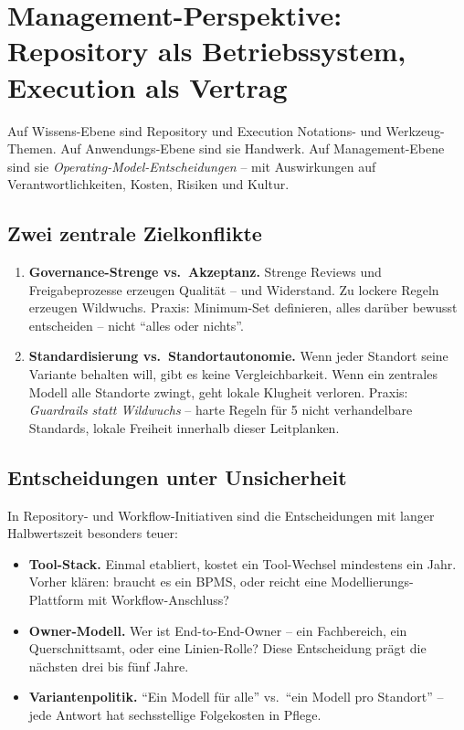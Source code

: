 \documentclass[11pt,a4paper,oneside]{article}
\newcommand{\fachbegriff}[1]{\textbf{#1}}
\begin{document}
\section{Management-Perspektive: Repository als Betriebssystem, Execution als Vertrag}

Auf Wissens-Ebene sind Repository und Execution Notations- und Werkzeug-Themen. Auf Anwendungs-Ebene sind sie Handwerk. Auf Management-Ebene sind sie \emph{Operating-Model-Entscheidungen} -- mit Auswirkungen auf Verantwortlichkeiten, Kosten, Risiken und Kultur.

\subsection{Zwei zentrale Zielkonflikte}

\begin{enumerate}
  \item \textbf{Governance-Strenge vs.\ Akzeptanz.} Strenge Reviews und Freigabeprozesse erzeugen Qualität -- und Widerstand. Zu lockere Regeln erzeugen Wildwuchs. Praxis: Minimum-Set definieren, alles darüber bewusst entscheiden -- nicht ``alles oder nichts''.
  \item \textbf{Standardisierung vs.\ Standortautonomie.} Wenn jeder Standort seine Variante behalten will, gibt es keine Vergleichbarkeit. Wenn ein zentrales Modell alle Standorte zwingt, geht lokale Klugheit verloren. Praxis: \emph{Guardrails statt Wildwuchs} -- harte Regeln für 5 nicht verhandelbare Standards, lokale Freiheit innerhalb dieser Leitplanken.
\end{enumerate}

\subsection{Entscheidungen unter Unsicherheit}

In Repository- und Workflow-Initiativen sind die Entscheidungen mit langer Halbwertszeit besonders teuer:

\begin{itemize}
  \item \fachbegriff{Tool-Stack.} Einmal etabliert, kostet ein Tool-Wechsel mindestens ein Jahr. Vorher klären: braucht es ein BPMS, oder reicht eine Modellierungs-Plattform mit Workflow-Anschluss?
  \item \fachbegriff{Owner-Modell.} Wer ist End-to-End-Owner -- ein Fachbereich, ein Querschnittsamt, oder eine Linien-Rolle? Diese Entscheidung prägt die nächsten drei bis fünf Jahre.
  \item \fachbegriff{Variantenpolitik.} ``Ein Modell für alle'' vs.\ ``ein Modell pro Standort'' -- jede Antwort hat sechsstellige Folgekosten in Pflege.
\end{itemize}
\end{document}
